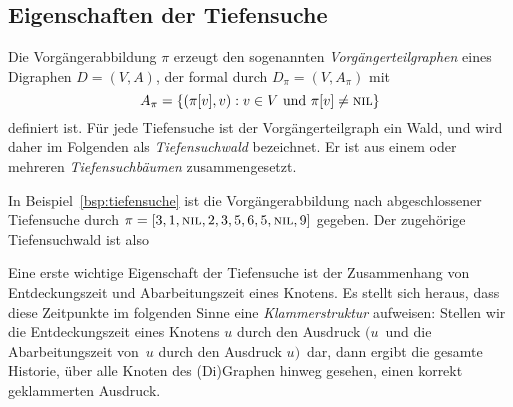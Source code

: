 \subsection{Eigenschaften der Tiefensuche}

\begin{defn} 
Die Vorgängerabbildung $\pi$ erzeugt den sogenannten \emph{Vorgängerteilgraphen} eines Digraphen $D=(V,A)$, der formal durch $D_\pi=(V,A_\pi)$ mit
\[
A_\pi = \left\{(\pi[v],v) : v \in V \text{ und } \pi[v] \neq \mathop{\text{\textsc{nil}}}\right\}
\]
definiert ist.
Für jede Tiefensuche ist der Vorgängerteilgraph ein Wald, und wird daher im Folgenden als \emph{Tiefensuchwald} bezeichnet.
Er ist aus einem oder mehreren \emph{Tiefensuchbäumen} zusammengesetzt.
\end{defn} 

\begin{bsp} 
In Beispiel~\ref{bsp:tiefensuche} ist die Vorgängerabbildung nach abgeschlossener Tiefensuche durch $\pi=[3,1,\mathop{\text{\textsc{nil}}},2,3,5,6,5,\mathop{\text{\textsc{nil}}},9]$ gegeben.
Der zugehörige Tiefensuchwald ist also

\begin{center} 
\end{center} 
\end{bsp} 

\begin{bem}
Eine erste wichtige Eigenschaft der Tiefensuche ist der Zusammenhang von Entdeckungszeit und Abarbeitungszeit eines Knotens.
Es stellt sich heraus, dass diese Zeitpunkte im folgenden Sinne eine \emph{Klammerstruktur} aufweisen:
Stellen wir die Entdeckungszeit eines Knotens $u$ durch den Ausdruck \glqq $(u$\grqq\ und die Abarbeitungszeit von~$u$ durch den Ausdruck \glqq $u)$\grqq\ dar, dann ergibt die gesamte Historie, über alle Knoten des (Di)Graphen hinweg gesehen, einen korrekt geklammerten Ausdruck.
\end{bem} 

